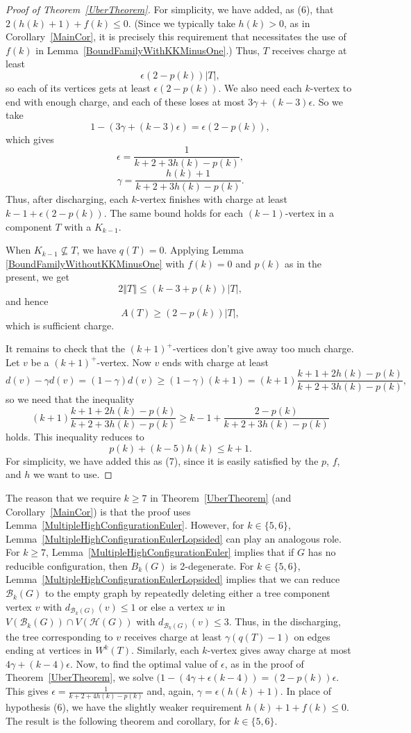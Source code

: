 \documentclass[12pt]{article}
\theoremstyle{plain}
\theoremstyle{definition}
\theoremstyle{remark}
\newcommand{\fancy}[1]{\mathcal{#1}}
\newcommand{\B}{\fancy{B}}
\newcommand{\HH}{\fancy{H}}
\newcommand{\card}[1]{\left|#1\right|}
\newcommand{\size}[1]{\left\Vert#1\right\Vert}
\newcommand{\parens}[1]{\left( #1 \right)}
\begin{document}
\begin{proof}[Proof of Theorem~\ref{UberTheorem}]
%
For simplicity, we have added, as (6), that $2(h(k) + 1) + f(k) \le 0$.  (Since we typically take $h(k) > 0$, as in Corollary~\ref{MainCor}, it is precisely this requirement that necessitates the use of $f(k)$ in Lemma~\ref{BoundFamilyWithKKMinusOne}.)  Thus, $T$ receives charge at least
\[\epsilon\parens{2-p(k)}\card{T},\]
so each of its vertices gets at least $\epsilon(2-p(k))$.
We also need each $k$-vertex to end with enough charge, and each of these loses at most $3\gamma+(k-3)\epsilon$.  So we take
\[1 - (3\gamma + (k-3)\epsilon) = \epsilon\parens{2-p(k)},\]
which gives
\[\epsilon = \frac{1}{k+2 + 3h(k) - p(k)},\]
\[\gamma = \frac{h(k)+1}{k+2 + 3h(k) - p(k)}.\]
Thus, after discharging, each $k$-vertex finishes with charge at least $k-1+\epsilon(2-p(k))$.  The same bound holds for each $(k-1)$-vertex in a component $T$ with a $K_{k-1}$.

When $K_{k-1} \not \subseteq T$, we have $q(T) = 0$.  Applying Lemma \ref{BoundFamilyWithoutKKMinusOne} with $f(k) = 0$ and $p(k)$ as in the present, we get 
\[2\size{T} \le (k-3 + p(k))\card{T},\]
and hence
\[A(T) \ge (2-p(k))\card{T},\]
which is sufficient charge.

It remains to check that the $(k+1)^+$-vertices don't give away too much charge.  Let $v$ be a $(k+1)^+$-vertex. Now $v$ ends with charge at least
\[d(v) - \gamma d(v) = (1-\gamma)d(v) \ge (1-\gamma)(k+1) = (k+1)\frac{k+1 + 2h(k) - p(k)}{k+2 + 3h(k) - p(k)},\]
so we need that the inequality
\[(k+1)\frac{k+1 + 2h(k) - p(k)}{k+2 + 3h(k) - p(k)} \ge k-1 + \frac{2-p(k)}{k+2 + 3h(k) - p(k)}\]
holds.  This inequality reduces to
\[p(k) + (k-5)h(k) \le k+1.\]
For simplicity, we have added this as (7), since it is easily satisfied by the $p$, $f$, and $h$ we want to use.
\end{proof}

The reason that we require $k\ge 7$ in Theorem~\ref{UberTheorem} (and Corollary~\ref{MainCor}) is that the proof uses Lemma~\ref{MultipleHighConfigurationEuler}.
However, for $k\in\{5,6\}$, Lemma~\ref{MultipleHighConfigurationEulerLopsided} can play an analogous role.  
For $k\ge 7$, Lemma~\ref{MultipleHighConfigurationEuler} implies that if $G$ has no reducible configuration, then $B_k(G)$ is
2-degenerate.  For $k\in\{5,6\}$, Lemma~\ref{MultipleHighConfigurationEulerLopsided} implies that we can reduce $\B_k(G)$ to 
the empty graph by repeatedly deleting either a tree component vertex $v$ with $d_{\B_k(G)}(v)\le 1$ or else a vertex $w$ in 
$V(\B_k(G))\cap V(\HH(G))$ with $d_{\B_k(G)}(v)\le 3$.  Thus, in the discharging, the tree corresponding to $v$ receives charge 
at least $\gamma(q(T)-1)$ on edges ending at vertices in $W^k(T)$.  Similarly, each $k$-vertex gives away charge at most 
$4\gamma+(k-4)\epsilon$.  Now, to find the optimal value of $\epsilon$, as in the proof of Theorem~\ref{UberTheorem}, we 
solve $(1-(4\gamma+\epsilon(k-4))=(2-p(k))\epsilon$.  This gives $\epsilon = \frac1{k+2+4h(k)-p(k)}$ and, again, 
$\gamma=\epsilon(h(k)+1)$.  In place of hypothesis (6), we have the slightly weaker requirement $h(k)+1+f(k)\le 0$.  The result is 
the following theorem and corollary, for $k\in\{5,6\}$.
\end{document}

